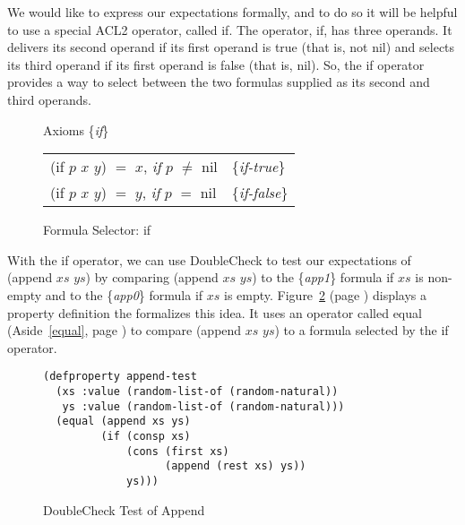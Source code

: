 We would like to express our expectations formally,
and to do so it will be helpful to use a special ACL2 operator,
called \textsf{if}.
The operator, \textsf{if}, has three operands.
It delivers its second operand if
its first operand is true (that is, not \textsf{nil})
and selects its third operand
if its first operand is false (that is, \textsf{nil}).
So, the \textsf{if} operator provides a way to select between
the two formulas supplied as its second and third operands.

\begin{figure}
\begin{center}
Axioms \{\emph{if}\} \\
\begin{tabular}{ll}
\textsf{(if $p$ $x$ $y$}) $=$ $x$, \emph{if} $p$ $\neq$ \textsf{nil}  & \{\emph{if-true}\}  \\
\textsf{(if $p$ $x$ $y$)} $=$ $y$, \emph{if} $p$ $=$ \textsf{nil}     & \{\emph{if-false}\} \\
\end{tabular}
\end{center}
\caption{Formula Selector: \textsf{if}}
\label{fig:if-axioms}
\end{figure}

With the \textsf{if} operator, we can use DoubleCheck 
to test our expectations of \textsf{(append $xs$ $ys$)}
by comparing \textsf{(append $xs$ $ys$)} to the \{\emph{app1}\} formula
if $xs$ is non-empty and to the \{\emph{app0}\} formula if $xs$ is empty.
Figure~\ref{fig:append-test} (page \pageref{fig:append-test})
displays a property definition the formalizes this idea.
It uses an operator called 
\textsf{equal} (Aside~\ref{equal}, page \pageref{equal})
to compare \textsf{(append $xs$ $ys$)} 
to a formula selected by the \textsf{if} operator.

\begin{figure}
\begin{Verbatim}
(defproperty append-test
  (xs :value (random-list-of (random-natural))
   ys :value (random-list-of (random-natural)))
  (equal (append xs ys)
         (if (consp xs)
             (cons (first xs)
                   (append (rest xs) ys))
             ys)))
\end{Verbatim}
\caption{DoubleCheck Test of Append}
\label{fig:append-test}
\end{figure}

